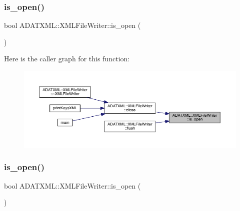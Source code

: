 \mbox{\label{classADATXML_1_1XMLFileWriter_a60fa87bbd9300c37386f9fdcb9460f74}} 
\subsubsection{\texorpdfstring{is\_open()}{is\_open()}\hspace{0.1cm}{\footnotesize\ttfamily [2/3]}}
{\footnotesize\ttfamily bool A\+D\+A\+T\+X\+M\+L\+::\+X\+M\+L\+File\+Writer\+::is\+\_\+open (\begin{DoxyParamCaption}{ }\end{DoxyParamCaption})}

Here is the caller graph for this function\+:
\nopagebreak
\begin{figure}[H]
\begin{center}
\leavevmode
\includegraphics[width=350pt]{d6/ddb/classADATXML_1_1XMLFileWriter_a60fa87bbd9300c37386f9fdcb9460f74_icgraph}
\end{center}
\end{figure}
\mbox{\label{classADATXML_1_1XMLFileWriter_a60fa87bbd9300c37386f9fdcb9460f74}} 
\subsubsection{\texorpdfstring{is\_open()}{is\_open()}\hspace{0.1cm}{\footnotesize\ttfamily [3/3]}}
{\footnotesize\ttfamily bool A\+D\+A\+T\+X\+M\+L\+::\+X\+M\+L\+File\+Writer\+::is\+\_\+open (\begin{DoxyParamCaption}{ }\end{DoxyParamCaption})}

